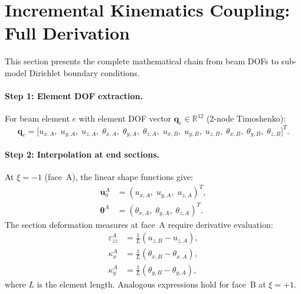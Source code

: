 \section{Incremental Kinematics Coupling: Full Derivation}
\label{sec:nlevo-coupling-derivation}

This section presents the complete mathematical chain from beam DOFs
to sub-model Dirichlet boundary conditions.

\paragraph{Step 1: Element DOF extraction.}
For beam element $e$ with element DOF vector
$\mathbf{q}_e \in \mathbb{R}^{12}$ (2-node Timoshenko):
\begin{equation}
  \mathbf{q}_e
  = \bigl[
      u_{x,A},\; u_{y,A},\; u_{z,A},\;
      \theta_{x,A},\; \theta_{y,A},\; \theta_{z,A},\;
      u_{x,B},\; u_{y,B},\; u_{z,B},\;
      \theta_{x,B},\; \theta_{y,B},\; \theta_{z,B}
    \bigr]^T.
  \label{eq:nlevo-qe}
\end{equation}

\paragraph{Step 2: Interpolation at end sections.}
At $\xi = -1$ (face~A), the linear shape functions give:
\begin{align}
  \mathbf{u}_0^A &= (u_{x,A},\; u_{y,A},\; u_{z,A})^T, \\
  \boldsymbol{\theta}^A &= (\theta_{x,A},\; \theta_{y,A},\;
    \theta_{z,A})^T.
\end{align}
The section deformation measures at face~A require derivative
evaluation:
\begin{align}
  \varepsilon_{zz}^A
    &= \frac{1}{L}(u_{z,B} - u_{z,A}), \\
  \kappa_x^A
    &= \frac{1}{L}(\theta_{x,B} - \theta_{x,A}), \\
  \kappa_y^A
    &= \frac{1}{L}(\theta_{y,B} - \theta_{y,A}),
\end{align}
where $L$ is the element length.  Analogous expressions hold for
face~B at $\xi = +1$.

